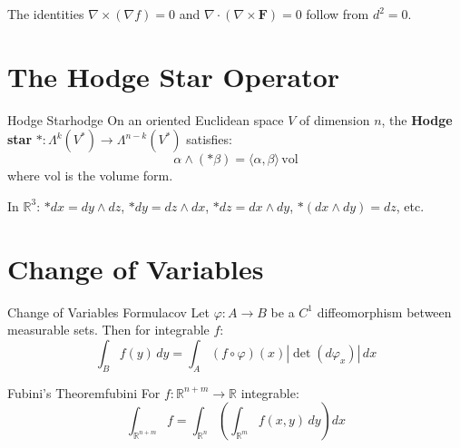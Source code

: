 \documentclass[11pt, letterpaper, openany]{book}
\begin{document}
The identities $\nabla \times (\nabla f) = 0$ and $\nabla \cdot (\nabla \times \mathbf{F}) = 0$ follow from $d^2 = 0$.

\section{The Hodge Star Operator}

\begin{defn}{Hodge Star}{hodge}
On an oriented Euclidean space $V$ of dimension $n$, the \textbf{Hodge star} $*: \Lambda^k(V^*) \to \Lambda^{n-k}(V^*)$ satisfies:
\[
\alpha \wedge (*\beta) = \langle \alpha, \beta \rangle \, \text{vol}
\]
where $\text{vol}$ is the volume form.
\end{defn}

\begin{example}
In $\mathbb{R}^3$: $*dx = dy \wedge dz$, $*dy = dz \wedge dx$, $*dz = dx \wedge dy$, $*(dx \wedge dy) = dz$, etc.
\end{example}

\section{Change of Variables}

\begin{thm}{Change of Variables Formula}{cov}
Let $\varphi: A \to B$ be a $C^1$ diffeomorphism between measurable sets. Then for integrable $f$:
\[
\int_B f(y) \, dy = \int_A (f \circ \varphi)(x) |\det(d\varphi_x)| \, dx
\]
\end{thm}

\begin{thm}{Fubini's Theorem}{fubini}
For $f: \mathbb{R}^{n+m} \to \mathbb{R}$ integrable:
\[
\int_{\mathbb{R}^{n+m}} f = \int_{\mathbb{R}^n} \left( \int_{\mathbb{R}^m} f(x, y) \, dy \right) dx
\]
\end{thm}
\end{document}
